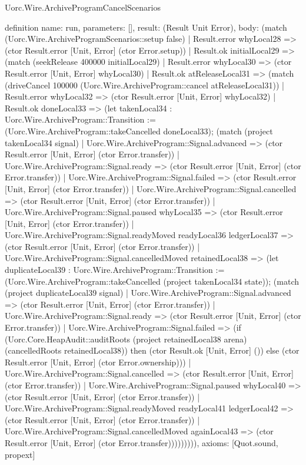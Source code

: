 \begin{lexlean}{Uorc.Wire.ArchiveProgramCancelScenarios}
\begin{semanticmodule}
definition{
  name: run,
  parameters: [],
  result: (Result Unit Error),
  body: (match (Uorc.Wire.ArchiveProgramScenarios::setup false)
    | Result.error whyLocal28 => (ctor Result.error [Unit, Error] (ctor Error.setup))
    | Result.ok initialLocal29 => (match (seekRelease 400000 initialLocal29)
      | Result.error whyLocal30 => (ctor Result.error [Unit, Error] whyLocal30)
      | Result.ok atReleaseLocal31 => (match (driveCancel 100000 (Uorc.Wire.ArchiveProgram::cancel atReleaseLocal31))
        | Result.error whyLocal32 => (ctor Result.error [Unit, Error] whyLocal32)
        | Result.ok doneLocal33 => (let takenLocal34 : Uorc.Wire.ArchiveProgram::Transition := (Uorc.Wire.ArchiveProgram::takeCancelled doneLocal33); (match (project takenLocal34 signal)
          | Uorc.Wire.ArchiveProgram::Signal.advanced => (ctor Result.error [Unit, Error] (ctor Error.transfer))
          | Uorc.Wire.ArchiveProgram::Signal.ready => (ctor Result.error [Unit, Error] (ctor Error.transfer))
          | Uorc.Wire.ArchiveProgram::Signal.failed => (ctor Result.error [Unit, Error] (ctor Error.transfer))
          | Uorc.Wire.ArchiveProgram::Signal.cancelled => (ctor Result.error [Unit, Error] (ctor Error.transfer))
          | Uorc.Wire.ArchiveProgram::Signal.paused whyLocal35 => (ctor Result.error [Unit, Error] (ctor Error.transfer))
          | Uorc.Wire.ArchiveProgram::Signal.readyMoved readyLocal36 ledgerLocal37 => (ctor Result.error [Unit, Error] (ctor Error.transfer))
          | Uorc.Wire.ArchiveProgram::Signal.cancelledMoved retainedLocal38 => (let duplicateLocal39 : Uorc.Wire.ArchiveProgram::Transition := (Uorc.Wire.ArchiveProgram::takeCancelled (project takenLocal34 state)); (match (project duplicateLocal39 signal)
            | Uorc.Wire.ArchiveProgram::Signal.advanced => (ctor Result.error [Unit, Error] (ctor Error.transfer))
            | Uorc.Wire.ArchiveProgram::Signal.ready => (ctor Result.error [Unit, Error] (ctor Error.transfer))
            | Uorc.Wire.ArchiveProgram::Signal.failed => (if (Uorc.Core.HeapAudit::auditRoots (project retainedLocal38 arena) (cancelledRoots retainedLocal38)) then (ctor Result.ok [Unit, Error] ()) else (ctor Result.error [Unit, Error] (ctor Error.ownership)))
            | Uorc.Wire.ArchiveProgram::Signal.cancelled => (ctor Result.error [Unit, Error] (ctor Error.transfer))
            | Uorc.Wire.ArchiveProgram::Signal.paused whyLocal40 => (ctor Result.error [Unit, Error] (ctor Error.transfer))
            | Uorc.Wire.ArchiveProgram::Signal.readyMoved readyLocal41 ledgerLocal42 => (ctor Result.error [Unit, Error] (ctor Error.transfer))
            | Uorc.Wire.ArchiveProgram::Signal.cancelledMoved againLocal43 => (ctor Result.error [Unit, Error] (ctor Error.transfer))))))))),
  axioms: [Quot.sound, propext]
}
\end{semanticmodule}
\end{lexlean}
